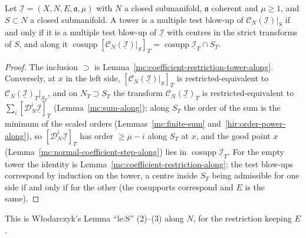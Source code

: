\begin{theorem}
\label{mc:coefficient-restriction-full-along}
\leanok
Let \(\underline{\mathcal I}=(X,N,E,\mathfrak a,\mu)\) with \(N\) a closed submanifold, \(\mathfrak a\) coherent and \(\mu\ge1\), and \(S\subset N\) a closed submanifold. A tower is a
multiple test blow-up of \(\mathcal C_N(\underline{\mathcal I})|_S\) if and only if it is a multiple test blow-up of \(\underline{\mathcal I}\) with centres in the strict
transforms of \(S\), and along it \(\operatorname{cosupp}[\mathcal C_N(\underline{\mathcal I})|_S]_T=\operatorname{cosupp}\underline{\mathcal I}_T\cap S_T\).
\end{theorem}
\begin{proof}
\leanok
The inclusion \(\supset\) is Lemma~\ref{mc:coefficient-restriction-tower-along}. Conversely, at \(x\) in the left side, \([\mathcal C_N(\underline{\mathcal I})|_S]_T\) is
restricted-equivalent to \(\mathcal C_N(\underline{\mathcal I})_T|_{S_T}\), and on \(N_T\supset S_T\) the transform \(\mathcal C_N(\underline{\mathcal I})_T\) is restricted-equivalent
to \(\sum_i[\mathcal D_N^i\underline{\mathcal I}]_T\) (Lemma~\ref{mc:sum-along}); along \(S_T\) the order of the sum is the minimum of the scaled orders
(Lemmas~\ref{mc:finite-sum} and~\ref{hir:order-power-along}), so \([\mathcal D_N^i\underline{\mathcal I}]_T\) has order \(\ge\mu-i\) along \(S_T\) at \(x\), and the good point \(x\)
(Lemma~\ref{mc:normal-coefficient-step-along}) lies in \(\operatorname{cosupp}\underline{\mathcal I}_T\). For the empty tower the identity is
Lemma~\ref{mc:coefficient-restriction-along}; the test blow-ups correspond by induction on the tower, a centre inside \(S_T\) being admissible for one side if and only if
for the other (the cosupports correspond and \(E\) is the same).
\end{proof}
This is Włodarczyk's Lemma ``le:S'' (2)--(3) along \(N\), for the restriction keeping \(E\).

